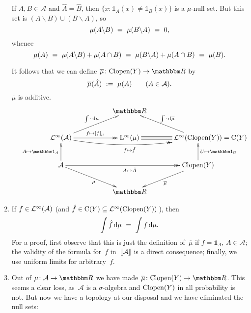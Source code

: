 \documentclass[main.tex]{subfiles}
\begin{document}
\begin{psec}{6.20}
\begin{enumerate}
If $A,B\in \mathcal A$ and $\hat A=\hat B$,
then $\{x\colon \mathbb{1}_A(x)\neq\mathbb{1}_B(x)\}$
is a $\mu$-null set.
But this set is $(A\backslash B)\cup(B\backslash A)$,
so
\begin{equation*}
\mu(A\backslash B)\ =\ \mu(B\backslash A)\ =\ 0\text{,}
\end{equation*}
whence
\begin{equation*}
\mu(A)\ =\ \mu(A\backslash B) + \mu(A\cap B)
\ =\ \mu(B\backslash A) + \mu(A\cap B)
\ =\ \mu(B)\htam{.}
\end{equation*}

It follows that we can define
$\overline \mu\colon \clopen(Y)\ra \R$ by
\begin{equation*}
\overline{\mu} (\hat A)\ :=\ \mu(A)\qquad (A\in\mathcal A)\text{.}
\end{equation*}
$\overline \mu$ is additive.
\begin{equation*}
\xymatrix@!C{
&
 \R & 
\\
\BLeb(\mathcal{A})
  \ar[ru]^{\int\cdot\,\mathrm{d}\mu}
  \ar@/_1em/@{->>}[rr]_{f\mapsto \hat f}
  \ar@{->>}[r]^{f\mapsto [f]_\mu}&
\BNL(\mu) 
  \ar@3{-}[r]&
\lsub{\BLeb(\clopen(Y))=\Cont{Y}}{\BLeb(\clopen(Y))}
  \ar[lu]_{\int\cdot\,\mathrm{d}\overline\mu}\\
\mathcal{A}
  \ar@{->>}[rr]_{A\mapsto\hat A}
  \ar[rd]_\mu
  \ar[u]^{A\mapsto\mathbb{1}_A}&
&
\clopen(Y)
  \ar[ld]^{\overline\mu}
  \ar[u]_{U\mapsto\mathbb{1}_U}\\
&
\R&
}
\end{equation*}
%
\item\label{6.20-4}
If $f\in\mathcal{L}^\infty(\mathcal A)$
(and $\hat f\in\mathrm{C}(Y)\subseteq \mathcal{L}^\infty(\mathrm{Clopen}(Y))$\,), then
\begin{equation*}
\int \hat{f}\,\mathrm{d}\overline{\mu}\ =\ \int f\,\mathrm{d}\mu\text{.}
\end{equation*}
For a proof,
first observe that this is just the definition of~$\overline \mu$
if $f=\mathbb{1}_A$, $A\in\mathcal A$;
the validity of the formula for~$f$ in~$\lbb\mathcal A\rbb$
is a direct consequence;
finally, we use uniform limits for arbitrary~$f$.
%
\item\label{6.20-5}
Out of $\mu\colon\mathcal A\ra \R$
we have made $\overline\mu\colon\clopen(Y)\ra\R$.
This seems a clear loss,
as~$\mathcal A$ is a $\sigma$-algebra
and $\mathrm{Clopen}(Y)$
in all probability is not.
But now we have a topology at our disposal
and we have eliminated the null sets:
\end{enumerate}
\end{psec}
\end{document}
